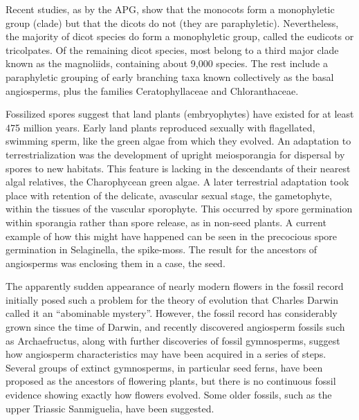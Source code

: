 Recent studies, as by the APG, show that the monocots form a monophyletic group (clade) but that the dicots do not (they are paraphyletic). Nevertheless, the majority of dicot species do form a monophyletic group, called the eudicots or tricolpates. Of the remaining dicot species, most belong to a third major clade known as the magnoliids, containing about 9,000 species. The rest include a paraphyletic grouping of early branching taxa known collectively as the basal angiosperms, plus the families Ceratophyllaceae and Chloranthaceae.

Fossilized spores suggest that land plants (embryophytes) have existed for at least 475 million years. Early land plants reproduced sexually with flagellated, swimming sperm, like the green algae from which they evolved. An adaptation to terrestrialization was the development of upright meiosporangia for dispersal by spores to new habitats. This feature is lacking in the descendants of their nearest algal relatives, the Charophycean green algae. A later terrestrial adaptation took place with retention of the delicate, avascular sexual stage, the gametophyte, within the tissues of the vascular sporophyte. This occurred by spore germination within sporangia rather than spore release, as in non-seed plants. A current example of how this might have happened can be seen in the precocious spore germination in Selaginella, the spike-moss. The result for the ancestors of angiosperms was enclosing them in a case, the seed.

The apparently sudden appearance of nearly modern flowers in the fossil record initially posed such a problem for the theory of evolution that Charles Darwin called it an ``abominable mystery''. However, the fossil record has considerably grown since the time of Darwin, and recently discovered angiosperm fossils such as Archaefructus, along with further discoveries of fossil gymnosperms, suggest how angiosperm characteristics may have been acquired in a series of steps. Several groups of extinct gymnosperms, in particular seed ferns, have been proposed as the ancestors of flowering plants, but there is no continuous fossil evidence showing exactly how flowers evolved. Some older fossils, such as the upper Triassic Sanmiguelia, have been suggested.



